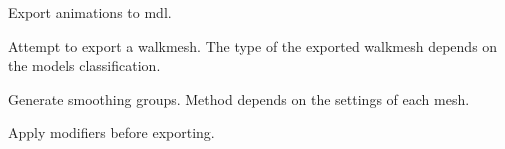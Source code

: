 \begin{description}[leftmargin=12em,style=nextline]
    \item[Export Animations] Export animations to mdl.
    \item[Export Walkmesh] Attempt to export a walkmesh. The type of the exported walkmesh depends on the models classification.
    \item[Export Smooth Groups] Generate smoothing groups. Method depends on the settings of each mesh.
    \item[Apply Modifiers] Apply modifiers before exporting.
\end{description}
